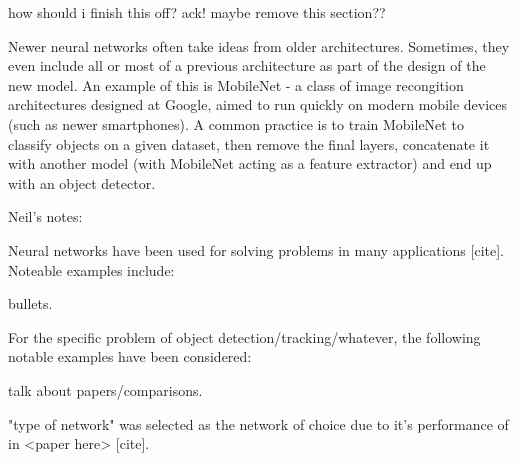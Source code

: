 {\Huge \color{red} how should i finish this off? ack! maybe remove this section??}

Newer neural networks often take ideas from older architectures. Sometimes, they even include all or most of a previous architecture as part of the design of the new model. An example of this is MobileNet - a class of image recongition architectures designed at Google, aimed to run quickly on modern mobile devices (such as newer smartphones). A common practice is to train MobileNet to classify objects on a given dataset, then remove the final layers, concatenate it with another model (with MobileNet acting as a feature extractor) and end up with an object detector.




{\color{red}
Neil's notes:

Neural networks have been used for solving problems in many applications [cite]. Noteable examples include:

bullets.

For the specific problem of object detection/tracking/whatever, the following notable examples have been considered:

talk about papers/comparisons.

"type of network" was selected as the network of choice due to it's performance of  in <paper here> [cite].
}
\fi


